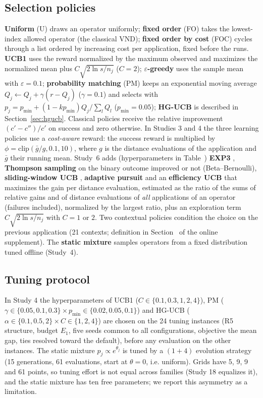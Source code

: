 \subsection{Selection policies}\label{sec:policies}
\textbf{Uniform} (U) draws an operator uniformly; \textbf{fixed order} (FO) takes the lowest-index allowed operator (the classical VND); \textbf{fixed order by cost} (FOC) cycles through a list ordered by increasing cost per application, fixed before the runs. \textbf{UCB1} \citep{auer2002} uses the reward normalized by the maximum observed and maximizes the normalized mean plus $C\sqrt{2\ln s/n_j}$ ($C=2$); \textbf{$\varepsilon$-greedy} uses the sample mean with $\varepsilon=0.1$; \textbf{probability matching} (PM) \citep{thierens2005} keeps an exponential moving average $Q_j\leftarrow Q_j+\gamma(r-Q_j)$ ($\gamma=0.1$) and selects with $p_j=p_{\min}+(1-kp_{\min})Q_j/\sum_lQ_l$ ($p_{\min}=0.05$); \textbf{HG-UCB} is described in Section~\ref{sec:hgucb}. Classical policies receive the relative improvement $(c'-c'')/c'$ on success and zero otherwise. In Studies 3 and 4 the three learning policies use a \emph{cost-aware} reward: the success reward is multiplied by $\phi=\mathrm{clip}(\bar g/g,0.1,10)$, where $g$ is the distance evaluations of the application and $\bar g$ their running mean. Study~6 adds (hyperparameters in Table~) \textbf{EXP3} \citep{auer2002nonstochastic}, \textbf{Thompson sampling} \citep{thompson1933,russo2018} on the binary outcome improved or not (Beta--Bernoulli), \textbf{sliding-window UCB} \citep{garivier2011}, \textbf{adaptive pursuit} \citep{thierens2005} and an \textbf{efficiency UCB} that maximizes the gain per distance evaluation, estimated as the ratio of the sums of relative gains and of distance evaluations of \emph{all} applications of an operator (failures included), normalized by the largest ratio, plus an exploration term $C\sqrt{2\ln s/n_j}$ with $C=1$ or $2$. Two contextual policies condition the choice on the previous application (21 contexts; definition in Section~ of the online supplement). The \textbf{static mixture} samples operators from a fixed distribution tuned offline (Study~4).

\subsection{Tuning protocol}\label{sec:tuning}
In Study 4 the hyperparameters of UCB1 ($C\in\{0.1,0.3,1,2,4\}$), PM ($\gamma\in\{0.05,0.1,0.3\}\times p_{\min}\in\{0.02,0.05,0.1\}$) and HG-UCB ($\alpha\in\{0.1,0.5,2\}\times C\in\{1,2,4\}$) are chosen on the 24 tuning instances (R5 structure, budget $E_1$, five seeds common to all configurations, objective the mean gap, ties resolved toward the default), before any evaluation on the other instances. The static mixture $p_j\propto e^{\theta_j}$ is tuned by a $(1{+}4)$ evolution strategy (15 generations, 61 evaluations, start at $\theta=0$, i.e. uniform). Grids have 5, 9, 9 and 61 points, so tuning effort is not equal across families (Study 18 equalizes it), and the static mixture has ten free parameters; we report this asymmetry as a limitation.

